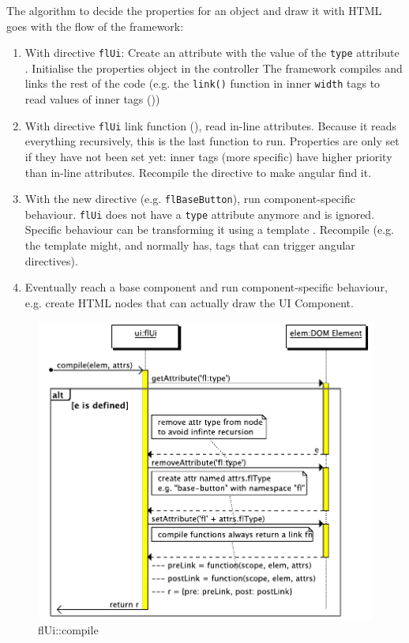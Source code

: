 The algorithm to decide the properties for an object and draw it with \ac{HTML} goes with the flow of the framework:
\begin{enumerate}
	\item With directive \texttt{flUi}: Create an attribute with the value of the \texttt{type} attribute . Initialise the properties object in the controller  The framework compiles and links the rest of the code (e.g. the \texttt{link()} function in inner \texttt{width} tags to read values of inner tags ())
	\item With directive \texttt{flUi} link function (), read in-line attributes. Because it reads everything recursively, this is the last function to run. Properties are only set if they have not been set yet: inner tags (more specific) have higher priority than in-line attributes. Recompile the directive to make angular find it. 
	\item With the new directive (e.g. \texttt{flBaseButton}), run component-specific behaviour. \texttt{flUi} does not have a \texttt{type} attribute anymore and is ignored. Specific behaviour can be transforming it using a template . Recompile (e.g. the template might, and normally has, tags that can trigger angular directives).
	\item Eventually reach a base component and run component-specific behaviour, e.g. create \ac{HTML} nodes that can actually draw the UI Component.
\end{enumerate}

\begin{figure}[htb]
    \centering
    \includegraphics{figures/design/seqdia/ui-compile.pdf}
    \caption{flUi::compile}
    \label{fig:design-seqdia-ui-compile}
\end{figure}

